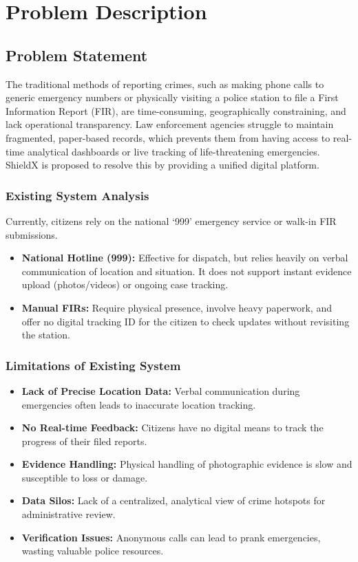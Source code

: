 \documentclass[12pt, a4paper, twoside, openany]{report}
\begin{document}
\chapter{Problem Description}
\section{Problem Statement}
The traditional methods of reporting crimes, such as making phone calls to generic emergency numbers or physically visiting a police station to file a First Information Report (FIR), are time-consuming, geographically constraining, and lack operational transparency. Law enforcement agencies struggle to maintain fragmented, paper-based records, which prevents them from having access to real-time analytical dashboards or live tracking of life-threatening emergencies. ShieldX is proposed to resolve this by providing a unified digital platform.

\subsection{Existing System Analysis}
Currently, citizens rely on the national `999' emergency service or walk-in FIR submissions. 
\begin{itemize}[label={}, itemsep=1em]
    \item \textbf{National Hotline (999):} Effective for dispatch, but relies heavily on verbal communication of location and situation. It does not support instant evidence upload (photos/videos) or ongoing case tracking.
    \item \textbf{Manual FIRs:} Require physical presence, involve heavy paperwork, and offer no digital tracking ID for the citizen to check updates without revisiting the station.
\end{itemize}

\subsection{Limitations of Existing System}
\begin{itemize}[label={}, itemsep=1em]
    \item \textbf{Lack of Precise Location Data:} Verbal communication during emergencies often leads to inaccurate location tracking.
    \item \textbf{No Real-time Feedback:} Citizens have no digital means to track the progress of their filed reports.
    \item \textbf{Evidence Handling:} Physical handling of photographic evidence is slow and susceptible to loss or damage.
    \item \textbf{Data Silos:} Lack of a centralized, analytical view of crime hotspots for administrative review.
    \item \textbf{Verification Issues:} Anonymous calls can lead to prank emergencies, wasting valuable police resources.
\end{itemize}
\end{document}
